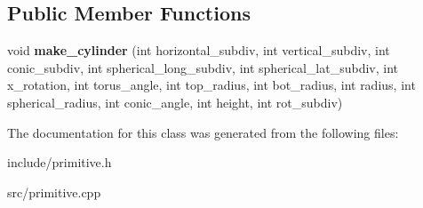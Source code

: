 \subsection*{Public Member Functions}
\begin{DoxyCompactItemize}
\item 
\mbox{\label{classcylinder_a31170e0b630d2210a08434e885ce76bd}} 
void {\bfseries make\+\_\+cylinder} (int horizontal\+\_\+subdiv, int vertical\+\_\+subdiv, int conic\+\_\+subdiv, int spherical\+\_\+long\+\_\+subdiv, int spherical\+\_\+lat\+\_\+subdiv, int x\+\_\+rotation, int torus\+\_\+angle, int top\+\_\+radius, int bot\+\_\+radius, int radius, int spherical\+\_\+radius, int conic\+\_\+angle, int height, int rot\+\_\+subdiv)
\end{DoxyCompactItemize}


The documentation for this class was generated from the following files\+:\begin{DoxyCompactItemize}
\item 
include/primitive.\+h\item 
src/primitive.\+cpp\end{DoxyCompactItemize}
